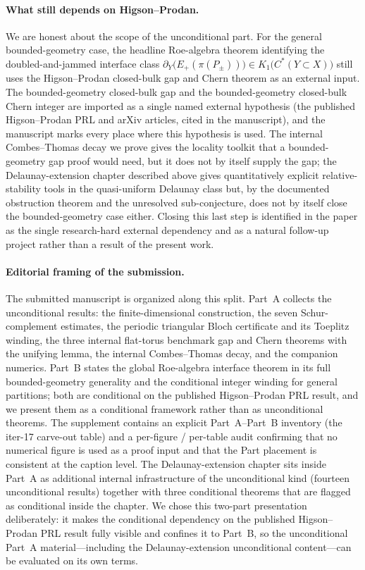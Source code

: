 \documentclass[11pt]{article}
\begin{document}
\paragraph{What still depends on Higson--Prodan.}
We are honest about the scope of the unconditional part. For the general
bounded-geometry case, the headline Roe-algebra theorem identifying the
doubled-and-jammed interface class
$\partial_Y\!\bigl(E_+(\pi(P_\pm))\bigr) \in K_1\!\bigl(C^*(Y\subset X)\bigr)$
still uses the Higson--Prodan closed-bulk gap and Chern theorem as an
external input. The bounded-geometry closed-bulk gap and the
bounded-geometry closed-bulk Chern integer are imported as a single named
external hypothesis (the published Higson--Prodan PRL and arXiv articles,
cited in the manuscript), and the manuscript marks every place where this
hypothesis is used. The internal Combes--Thomas decay we prove gives the
locality toolkit that a bounded-geometry gap proof would need, but it does
not by itself supply the gap; the Delaunay-extension chapter described
above gives quantitatively explicit relative-stability tools in the
quasi-uniform Delaunay class but, by the documented obstruction theorem
and the unresolved sub-conjecture, does not by itself close the
bounded-geometry case either. Closing this last step is identified in the
paper as the single research-hard external dependency and as a natural
follow-up project rather than a result of the present work.

\paragraph{Editorial framing of the submission.}
The submitted manuscript is organized along this split. Part~A collects the
unconditional results: the finite-dimensional construction, the seven
Schur-complement estimates, the periodic triangular Bloch certificate and
its Toeplitz winding, the three internal flat-torus benchmark gap and Chern
theorems with the unifying lemma, the internal Combes--Thomas decay, and
the companion numerics. Part~B states the global Roe-algebra interface
theorem in its full bounded-geometry generality and the conditional integer
winding for general partitions; both are conditional on the published
Higson--Prodan PRL result, and we present them as a conditional framework
rather than as unconditional theorems. The supplement contains an explicit
Part~A--Part~B inventory (the iter-17 carve-out table) and a per-figure /
per-table audit confirming that no numerical figure is used as a proof
input and that the Part placement is consistent at the caption level. The
Delaunay-extension chapter sits inside Part~A as additional internal
infrastructure of the unconditional kind (fourteen unconditional results)
together with three conditional theorems that are flagged as conditional
inside the chapter. We chose this two-part presentation deliberately: it
makes the conditional dependency on the published Higson--Prodan PRL result
fully visible and confines it to Part~B, so the unconditional Part~A
material---including the Delaunay-extension unconditional content---can be
evaluated on its own terms.
\end{document}

